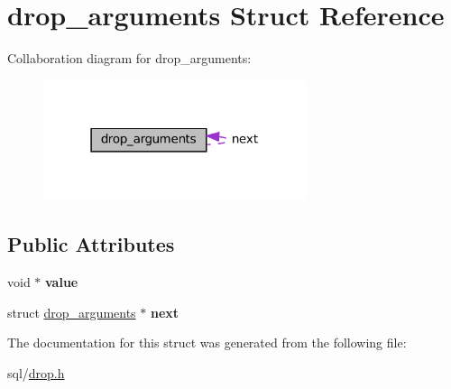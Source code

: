 \hypertarget{structdrop__arguments}{}\section{drop\+\_\+arguments Struct Reference}
\label{structdrop__arguments}


Collaboration diagram for drop\+\_\+arguments\+:\nopagebreak
\begin{figure}[H]
\begin{center}
\leavevmode
\includegraphics[width=219pt]{structdrop__arguments__coll__graph}
\end{center}
\end{figure}
\subsection*{Public Attributes}
\begin{DoxyCompactItemize}
\item 
\mbox{\label{structdrop__arguments_a83524221500748a3fbee93a486ffabba}} 
void $\ast$ {\bfseries value}
\item 
\mbox{\label{structdrop__arguments_a4375506674ae5bda2167689436c3ed47}} 
struct \hyperlink{structdrop__arguments}{drop\+\_\+arguments} $\ast$ {\bfseries next}
\end{DoxyCompactItemize}


The documentation for this struct was generated from the following file\+:\begin{DoxyCompactItemize}
\item 
sql/\hyperlink{drop_8h}{drop.\+h}\end{DoxyCompactItemize}
